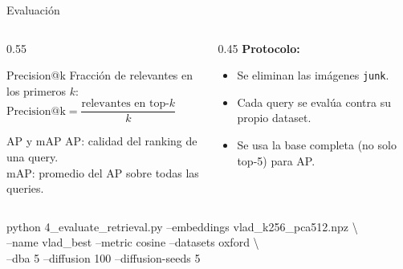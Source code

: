 \documentclass[aspectratio=169]{beamer}
\begin{document}
\begin{frame}[fragile]{Evaluaci\'on}
  \begin{columns}[T]
    \begin{column}{0.55\textwidth}
      \small
      \begin{block}{Precision@k}
        Fracci\'on de relevantes en los primeros $k$: \\
        $\text{Precision@k} = \dfrac{\text{relevantes en top-}k}{k}$
      \end{block}
      \begin{block}{AP y mAP}
        AP: calidad del ranking de una query.\\
        mAP: promedio del AP sobre todas las queries.
      \end{block}
    \end{column}
    \begin{column}{0.45\textwidth}
      \small
      \textbf{Protocolo:}
      \begin{itemize}
        \item Se eliminan las im\'agenes \texttt{junk}.
        \item Cada query se eval\'ua contra su propio dataset.
        \item Se usa la base completa (no solo top-5) para AP.
      \end{itemize}
    \end{column}
  \end{columns}
  \vspace{0.4em}
  {\tiny\ttfamily
  python 4\_evaluate\_retrieval.py --embeddings vlad\_k256\_pca512.npz \textbackslash\\
  \hspace*{2em}--name vlad\_best --metric cosine --datasets oxford \textbackslash\\
  \hspace*{2em}--dba 5 --diffusion 100 --diffusion-seeds 5
  }
\end{frame}
\end{document}
